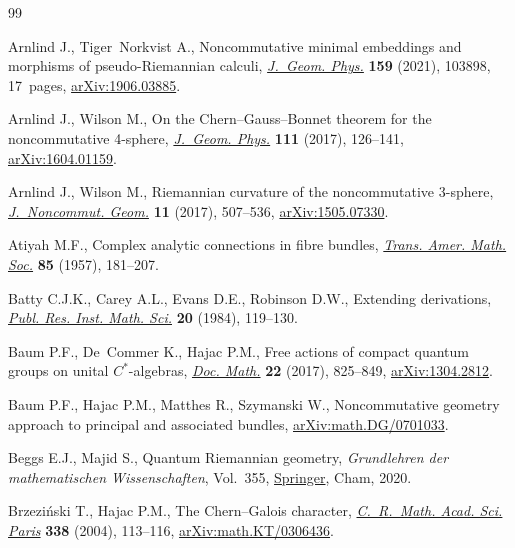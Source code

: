 \begin{thebibliography}{99}
\footnotesize\itemsep=0pt

Arnlind J., Tiger~Norkvist A., Noncommutative minimal embeddings and morphisms
 of pseudo-{R}iemannian calculi, \href{https://doi.org/10.1016/j.geomphys.2020.103898}{\textit{J.~Geom. Phys.}} \textbf{159} (2021),
 103898, 17~pages, \href{https://arxiv.org/abs/1906.03885}{arXiv:1906.03885}.

Arnlind J., Wilson M., On the {C}hern--{G}auss--{B}onnet theorem for the
 noncommutative 4-sphere, \href{https://doi.org/10.1016/j.geomphys.2016.10.016}{\textit{J.~Geom. Phys.}} \textbf{111} (2017),
 126--141, \href{https://arxiv.org/abs/1604.01159}{arXiv:1604.01159}.

Arnlind J., Wilson M., Riemannian curvature of the noncommutative 3-sphere,
 \href{https://doi.org/10.4171/JNCG/11-2-3}{\textit{J.~Noncommut. Geom.}} \textbf{11} (2017), 507--536,
 \href{https://arxiv.org/abs/1505.07330}{arXiv:1505.07330}.

Atiyah M.F., Complex analytic connections in fibre bundles, \href{https://doi.org/10.2307/1992969}{\textit{Trans.
 Amer. Math. Soc.}} \textbf{85} (1957), 181--207.

Batty C.J.K., Carey A.L., Evans D.E., Robinson D.W., Extending derivations,
 \href{https://doi.org/10.2977/prims/1195181832}{\textit{Publ. Res. Inst. Math. Sci.}} \textbf{20} (1984), 119--130.

Baum P.F., De~Commer K., Hajac P.M., Free actions of compact quantum groups on
 unital {$C^*$}-algebras, \href{https://doi.org/10.25537/dm.2017v22.825-849}{\textit{Doc. Math.}} \textbf{22} (2017), 825--849,
 \href{https://arxiv.org/abs/1304.2812}{arXiv:1304.2812}.

Baum P.F., Hajac P.M., Matthes R., Szymanski W., Noncommutative geometry
 approach to principal and associated bundles, \href{https://arxiv.org/abs/math.DG/0701033}{arXiv:math.DG/0701033}.

Beggs E.J., Majid S., Quantum {R}iemannian geometry, \textit{Grundlehren der
 mathematischen Wissenschaften}, Vol.~355, \href{https://doi.org/10.1007/978-3-030-30294-8}{Springer}, Cham, 2020.

Brzezi\'nski T., Hajac P.M., The {C}hern--{G}alois character,
 \href{https://doi.org/10.1016/j.crma.2003.11.009}{\textit{C.~R.~Math. Acad. Sci. Paris}} \textbf{338} (2004), 113--116,
 \href{https://arxiv.org/abs/math.KT/0306436}{arXiv:math.KT/0306436}.


\end{thebibliography}
